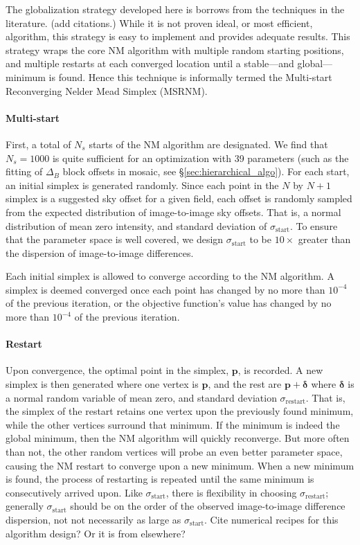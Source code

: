 \documentclass[iop]{emulateapj}
\newcommand{\vect}[1]{\boldsymbol{#1}} %
\newcommand{\todo}[1]{\textcolor{BurntOrange}{\textsf{#1}}} %
\newcommand{\Sec}[1]{\S\ref{sec:#1}}  %
\begin{document}
The globalization strategy developed here is borrows from the techniques in the literature.
\todo{(add citations.)}
While it is not proven ideal, or most efficient, algorithm, this strategy is easy to implement and provides adequate results.
This strategy wraps the core NM algorithm with multiple random starting positions, and multiple restarts at each converged location until a stable---and global---minimum is found.
Hence this technique is informally termed the Multi-start Reconverging Nelder Mead Simplex (MSRNM).

\paragraph{Multi-start} First, a total of $N_s$ starts of the NM algorithm are designated.
We find that $N_s=1000$ is quite sufficient for an optimization with 39 parameters (such as the fitting of $\Delta_B$ block offsets in mosaic, see \Sec{hierarchical_algo}).
For each start, an initial simplex is generated randomly.
Since each point in the $N$ by $N+1$ simplex is a suggested sky offset for a given field, each offset is randomly sampled from the expected distribution of image-to-image sky offsets.
That is, a normal distribution of mean zero intensity, and standard deviation of $\sigma_\mathrm{start}$.
To ensure that the parameter space is well covered, we design $\sigma_\mathrm{start}$ to be $10\times$ greater than the dispersion of image-to-image differences.

Each initial simplex is allowed to converge according to the NM algorithm.
A simplex is deemed converged once each point has changed by no more than $10^{-4}$ of the previous iteration, or the objective function's value has changed by no more than $10^{-4}$ of the previous iteration. 

\paragraph{Restart} Upon convergence, the optimal point in the simplex, $\vect{p}$, is recorded.
A new simplex is then generated where one vertex is $\vect{p}$, and the rest are $\vect{p}+\vect{\delta}$ where $\vect{\delta}$ is a normal random variable of mean zero, and standard deviation $\sigma_\mathrm{restart}$.
That is, the simplex of the restart retains one vertex upon the previously found minimum, while the other vertices surround that minimum.
If the minimum is indeed the global minimum, then the NM algorithm will quickly reconverge.
But more often than not, the other random vertices will probe an even better parameter space, causing the NM restart to converge upon a new minimum.
When a new minimum is found, the process of restarting is repeated until the same minimum is consecutively arrived upon.
Like $\sigma_\mathrm{start}$, there is flexibility in choosing $\sigma_\mathrm{restart}$; generally $\sigma_\mathrm{start}$ should be on the order of the observed image-to-image difference dispersion, not not necessarily as large as $\sigma_\mathrm{start}$.
\todo{Cite numerical recipes for this algorithm design? Or it is from elsewhere?}
\end{document}
